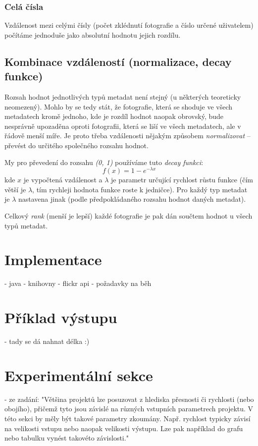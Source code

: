 \documentclass[12pt,oneside,a4paper]{article}
\begin{document}
\subsubsection{Celá čísla}
Vzdálenost mezi celými čísly (počet zklédnutí fotografie a číslo určené uživatelem) počítáme jednoduše jako absolutní hodnotu jejich rozdílu.

\subsection{Kombinace vzdáleností (normalizace, decay funkce)}
Rozsah hodnot jednotlivých typů metadat není stejný (u některých teoreticky neomezený). Mohlo by se tedy stát, že fotografie, která se shoduje ve všech metadatech kromě jednoho, kde je rozdíl hodnot naopak obrovský, bude nesprávně upozaděna oproti fotografii, která se liší ve všech metadatech, ale v řádově menší míře. Je proto třeba vzdálenosti nějakým způsobem \textit{normalizovat} -- převést do určitého společného rozsahu hodnot.

My pro převedení do rozsahu \textit{(0, 1)} používáme tuto \textit{decay funkci}:
\begin{equation}
	f(x) = 1 - e^{-\lambda x}
\end{equation}
kde \(x\) je vypočtená vzdálenost a \(\lambda\) je parametr určující rychlost růstu funkce (čím větší je \(\lambda\), tím rychleji hodnota funkce roste k jedničce). Pro každý typ metadat je \(\lambda\) nastavena jinak (podle předpokládaného rozsahu hodnot daných metadat).

Celkový \textit{rank} (menší je lepší) každé fotografie je pak dán součtem hodnot u všech typů metadat.

\section{Implementace}
- java
- knihovny
- flickr api
- požadavky na běh


\section{Příklad výstupu}
- tady se dá nahnat délka :)

\section{Experimentální sekce}
- ze zadání: "Většina projektů lze posuzovat z hlediska přesnosti či rychlosti (nebo obojího),
přičemž tyto jsou závislé na různých vstupních parametrech projektu. V této sekci by
měly být takové parametry zkoumány. Např. rychlost typicky závisí na velikosti
vstupu nebo naopak velikosti výstupu. Lze pak například do grafu nebo tabulku
vynést takovéto závislosti."
\end{document}
